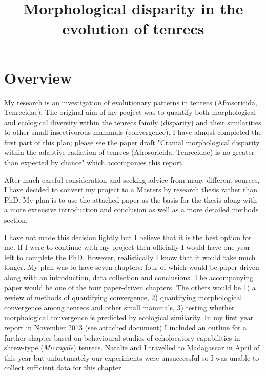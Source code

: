 \documentclass[12pt,a4paper]{article}
\begin{document}
\title{Morphological disparity in the evolution of tenrecs}
\author{}
\date{}
\maketitle


\renewcommand{\headrulewidth}{0.0pt}
\thispagestyle{fancy}				%
\chead{}


\section{Overview}
My research is an investigation of evolutionary patterns in tenrecs (Afrosoricida,  Tenrecidae). The original aim of my project was to quantify both morphological and ecological diversity within the tenrecs family (disparity) and their similarities to other small insectivorous mammals (convergence). I have almost completed the first part of this plan; please see the paper draft "Cranial morphological disparity within the adaptive radiation of tenrecs (Afrosoricida, Tenrecidae) is no greater than expected by chance" which accompanies this report.

After much careful consideration and seeking advice from many different sources, I have decided to convert my project to a Masters by research thesis rather than PhD. My plan is to use the attached paper as the basis for the thesis along with a more extensive introduction and conclusion as well as a more detailed methods section. 

I have not made this decision lightly but I believe that it is the best option for me. If I were to continue with my project then officially I would have one year left to complete the PhD. However, realistically I know that it would take much longer. My plan was to have seven chapters: four of which would be paper driven along with an introduction, data collection and conclusions. The accompanying paper would be one of the four paper-driven chapters. The others would be 1) a review of methods of quantifying convergence, 2) quantifying morphological convergence among tenrecs and other small mammals, 3) testing whether morphological convergence is predicted by ecological similarity. In my first year report in November 2013 (see attached document) I included an outline for a further chapter based on behavioural studies of echolocatory capabilities in shrew-type (\textit{Microgale}) tenrecs. Natalie and I travelled to Madagascar in April of this year but unfortunately our experiments were unsuccessful so I was unable to collect sufficient data for this chapter.
\end{document}
